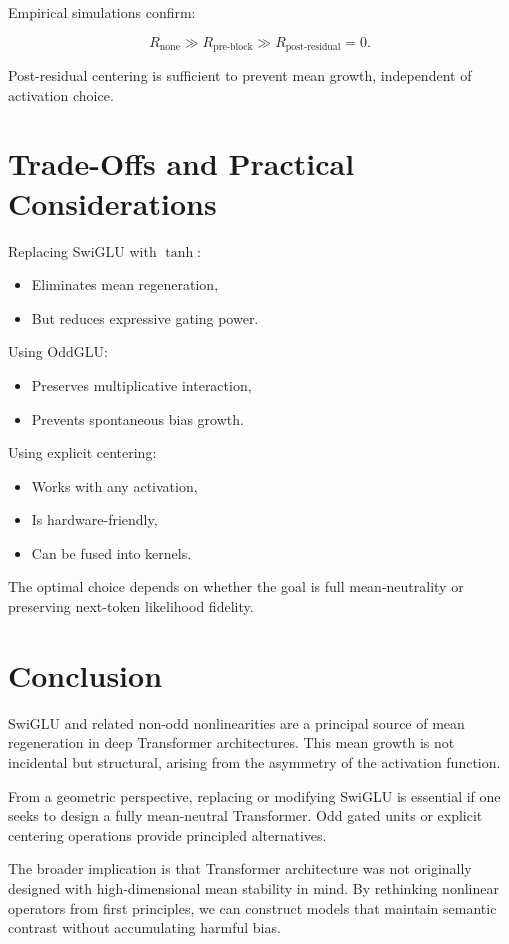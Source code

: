 Empirical simulations confirm:

\[
R_{\text{none}} \gg R_{\text{pre-block}} \gg R_{\text{post-residual}} = 0.
\]

Post-residual centering is sufficient to prevent mean growth,
independent of activation choice.

\section{Trade-Offs and Practical Considerations}

Replacing SwiGLU with $\tanh$:

\begin{itemize}
\item Eliminates mean regeneration,
\item But reduces expressive gating power.
\end{itemize}

Using OddGLU:

\begin{itemize}
\item Preserves multiplicative interaction,
\item Prevents spontaneous bias growth.
\end{itemize}

Using explicit centering:

\begin{itemize}
\item Works with any activation,
\item Is hardware-friendly,
\item Can be fused into kernels.
\end{itemize}

The optimal choice depends on whether the goal is
full mean-neutrality or preserving next-token likelihood fidelity.

\section{Conclusion}

SwiGLU and related non-odd nonlinearities are a principal source of
mean regeneration in deep Transformer architectures.
This mean growth is not incidental but structural,
arising from the asymmetry of the activation function.

From a geometric perspective, replacing or modifying SwiGLU
is essential if one seeks to design a fully mean-neutral Transformer.
Odd gated units or explicit centering operations
provide principled alternatives.

The broader implication is that Transformer architecture
was not originally designed with high-dimensional mean stability in mind.
By rethinking nonlinear operators from first principles,
we can construct models that maintain semantic contrast
without accumulating harmful bias.
